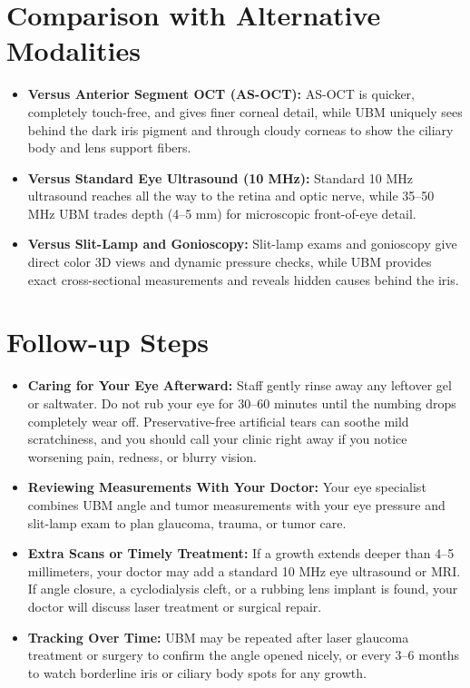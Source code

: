 \section{Comparison with Alternative Modalities}

\begin{itemize}
    \item \textbf{Versus Anterior Segment OCT (AS-OCT):} AS-OCT is quicker, completely touch-free, and gives finer corneal detail, while UBM uniquely sees behind the dark iris pigment and through cloudy corneas to show the ciliary body and lens support fibers.
    \item \textbf{Versus Standard Eye Ultrasound (10 MHz):} Standard 10 MHz ultrasound reaches all the way to the retina and optic nerve, while 35--50 MHz UBM trades depth (4--5 mm) for microscopic front-of-eye detail.
    \item \textbf{Versus Slit-Lamp and Gonioscopy:} Slit-lamp exams and gonioscopy give direct color 3D views and dynamic pressure checks, while UBM provides exact cross-sectional measurements and reveals hidden causes behind the iris.
\end{itemize}

\section{Follow-up Steps}

\begin{itemize}
    \item \textbf{Caring for Your Eye Afterward:} Staff gently rinse away any leftover gel or saltwater. Do not rub your eye for 30--60 minutes until the numbing drops completely wear off. Preservative-free artificial tears can soothe mild scratchiness, and you should call your clinic right away if you notice worsening pain, redness, or blurry vision.
    \item \textbf{Reviewing Measurements With Your Doctor:} Your eye specialist combines UBM angle and tumor measurements with your eye pressure and slit-lamp exam to plan glaucoma, trauma, or tumor care.
    \item \textbf{Extra Scans or Timely Treatment:} If a growth extends deeper than 4--5 millimeters, your doctor may add a standard 10 MHz eye ultrasound or MRI. If angle closure, a cyclodialysis cleft, or a rubbing lens implant is found, your doctor will discuss laser treatment or surgical repair.
    \item \textbf{Tracking Over Time:} UBM may be repeated after laser glaucoma treatment or surgery to confirm the angle opened nicely, or every 3--6 months to watch borderline iris or ciliary body spots for any growth.
\end{itemize}

